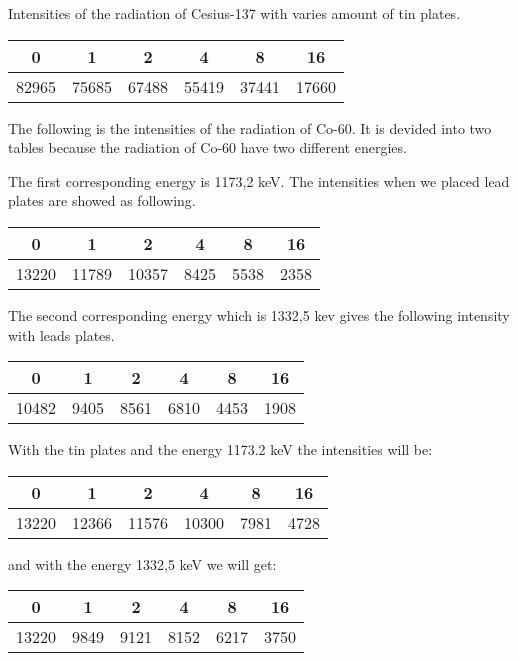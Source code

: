 Intensities of the radiation of Cesius-137 with varies amount of tin plates. 
\begin{center}
\begin{tabular} {|c|c|c|c|c|c|}
	\hline
	0 		& 1 	& 2 	& 4 	& 8 	& 16 	\\ \hline
	82965 	& 75685	& 67488 & 55419 & 37441 & 17660 \\ \hline
\end{tabular}
\end{center}

The following is the intensities of the radiation of Co-60. It is devided into two tables because the radiation of Co-60 have two different energies. 

The first corresponding energy is 1173,2 keV. The intensities when we placed lead plates are showed as following. 

\begin{center}
\begin{tabular} {|c|c|c|c|c|c|}
	\hline
	0 		& 1 	& 2 	& 4 	& 8 	& 16 	\\ \hline
	13220 	& 11789	& 10357 & 8425 	& 5538 	& 2358 	\\ \hline
\end{tabular}
\end{center}

The second corresponding energy which is 1332,5 kev gives the following intensity with leads plates.

\begin{center}
\begin{tabular} {|c|c|c|c|c|c|}
	\hline
	0 		& 1 	& 2 	& 4 	& 8 	& 16 	\\ \hline
	10482 	& 9405	& 8561 	& 6810 	& 4453 	& 1908 	\\ \hline
\end{tabular}
\end{center}


With the tin plates and the energy 1173.2 keV the intensities will be:

\begin{center}
\begin{tabular} {|c|c|c|c|c|c|}
	\hline
	0 		& 1 	& 2 	& 4 	& 8 	& 16 	\\ \hline
	13220	& 12366	& 11576	& 10300 & 7981 	& 4728 	\\ \hline
\end{tabular}
\end{center}

and with the energy 1332,5 keV we will get:

\begin{center}
\begin{tabular} {|c|c|c|c|c|c|}
	\hline
	0 		& 1 	& 2 	& 4 	& 8 	& 16 	\\ \hline
	13220	& 9849	& 9121	& 8152  & 6217 	& 3750 	\\ \hline
\end{tabular}
\end{center}